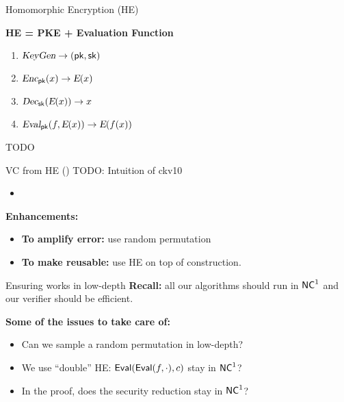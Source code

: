 \def\E{\func{E}}

\begin{frame}{Homomorphic Encryption (HE)}
	\begin{center} \textbf{HE = PKE + Evaluation Function} \end{center}
	\begin{enumerate}
		\item ${\textsl{KeyGen}} \to (\mathsf{pk}, \mathsf{sk})$
		\item $\func{Enc}_{\pk}(x) \to \E(x)$
		\item $\func{Dec}_{\sk}(\E(x)) \to x$
		\pause  
		\item $\func{Eval}_{\pk}(f, \E(x)) \to \E(f(x))$
	\end{enumerate}
	\pause
	
	\begin{result}
		TODO
	\end{result}
\end{frame}

\begin{frame}{VC from HE (\cite{ckv10})}
	TODO: Intuition of ckv10
	\begin{itemize}
		\item 
	\end{itemize}
	\pause
	\textbf{Enhancements:}
	\begin{itemize}
		\item \textbf{To amplify error:} use random permutation
		\item \textbf{To make reusable:} use HE  on top of construction.
	\end{itemize}
\end{frame}

\begin{frame}{Ensuring \cite{ckv10} works in low-depth}
	\textbf{Recall:} all our algorithms should run in ${\mathsf{NC}}^1$ and our verifier should be efficient.
	
	\textbf{Some of the issues to take care of: }
	\begin{itemize}
		\item Can we sample a random permutation in low-depth?
		\item We use ``double'' HE: $\mathsf{Eval}(\mathsf{Eval}(f, \cdot), c)$ stay in ${\mathsf{NC}}^1$?
		\item In the proof, does the security reduction stay in ${\mathsf{NC}}^1$?
	\end{itemize}
\end{frame}

